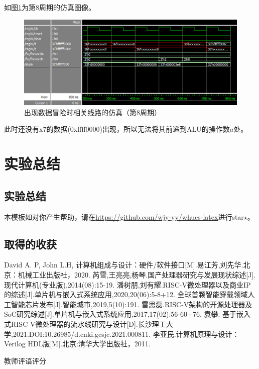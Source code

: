 \documentclass[UTF8,a4paper,autofakebold,15pt]{ctexart}
\begin{document}
如图\ref{fig:label10}为第8周期的仿真图像。

\begin{figure}
	\centering
	\includegraphics[scale=.8]{fig10.png}
	\caption{出现数据冒险时相关线路的仿真（第8周期）}
	\label{fig:label10}
\end{figure}

此时还没有x7的数据(0xffff0000)出现，所以无法将其前递到ALU的操作数$a$处。

\section{实验总结}
\subsection{实验总结}

本模板如对你产生帮助，请在\href{https://github.com/wjy-yy/whucs-latex}{https://github.com/wjy-yy/whucs-latex}进行star$\star$。


	
\subsection{取得的收获}
	
\newpage
\begin{thebibliography}{99}  
	
	David A. P, John L.H, 计算机组成与设计：硬件/软件接口[M].易江芳,刘先华.北京：机械工业出版社，2020.
	芮雪,王亮亮,杨琴.国产处理器研究与发展现状综述[J].现代计算机(专业版),2014(08):15-19.
	潘树朋,刘有耀.RISC-V微处理器以及商业IP的综述[J].单片机与嵌入式系统应用,2020,20(06):5-8+12.
	全球首颗智能穿戴领域人工智能芯片发布[J].智能城市,2019,5(10):191.
	雷思磊.RISC-V架构的开源处理器及SoC研究综述[J].单片机与嵌入式系统应用,2017,17(02):56-60+76.
	袁攀. 基于嵌入式RISC-V微处理器的流水线研究与设计[D].长沙理工大学,2021.DOI:10.26985/d.cnki.gcsjc.2021.000811.
	李亚民.计算机原理与设计：Verilog HDL版[M].北京:清华大学出版社，2011.
	
\end{thebibliography}
\newpage
\begin{center}
	 教师评语评分
\end{center}
\end{document}
